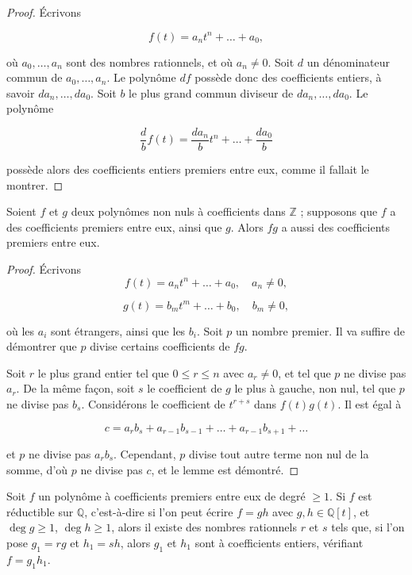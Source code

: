 \begin{proof}
    Écrivons 

\[
f(t) = a_n t^n + \dots + a_0,
\]

où \(a_0, \dots, a_n\) sont des nombres rationnels, et où \(a_n \neq 0\). Soit \(d\) un dénominateur commun de \(a_0, \dots, a_n\). Le polynôme \(df\) possède donc des coefficients entiers, à savoir \(da_n, \dots, da_0\). Soit \(b\) le plus grand commun diviseur de \(da_n, \dots, da_0\). Le polynôme 

\[
\frac{d}{b} f(t) = \frac{da_n}{b} t^n + \dots + \frac{da_0}{b}
\]

possède alors des coefficients entiers premiers entre eux, comme il fallait le montrer.
\end{proof}

\begin{lemme}
    Soient \(f\) et \(g\) deux polynômes non nuls à coefficients dans \(\mathbb{Z}\) ; supposons que \(f\) a des coefficients premiers entre eux, ainsi que \(g\). Alors \(fg\) a aussi des coefficients premiers entre eux.
\end{lemme}
    
\begin{proof}
    Écrivons
    \[
    f(t) = a_n t^n + \dots + a_0, \quad a_n \neq 0,
    \]
    
    \[
    g(t) = b_m t^m + \dots + b_0, \quad b_m \neq 0,
    \]
    
    où les \(a_i\) sont étrangers, ainsi que les \(b_i\). Soit \(p\) un nombre premier. Il va suffire de démontrer que \(p\) divise certains coefficients de \(fg\). 
    
    Soit \(r\) le plus grand entier tel que \(0 \leq r \leq n\) avec \(a_r \neq 0\), et tel que \(p\) ne divise pas \(a_r\). De la même façon, soit \(s\) le coefficient de \(g\) le plus à gauche, non nul, tel que \(p\) ne divise pas \(b_s\). Considérons le coefficient de \(t^{r+s}\) dans \(f(t) g(t)\). Il est égal à
    
    \[
    c = a_r b_s + a_{r-1} b_{s-1} + \dots + a_{r-1} b_{s+1} + \dots
    \]
    
    et \(p\) ne divise pas \(a_r b_s\). Cependant, \(p\) divise tout autre terme non nul de la somme, d'où \(p\) ne divise pas \(c\), et le lemme est démontré.
\end{proof}

\begin{theoreme}[Gauss]
        Soit \(f\) un polynôme à coefficients premiers entre eux de degré \(\geq 1\). Si \(f\) est réductible sur \(\mathbb{Q}\), c'est-à-dire si l’on peut écrire \(f = gh\) avec \(g, h \in \mathbb{Q}[t]\), et \(\deg g \geq 1\), \(\deg h \geq 1\), alors il existe des nombres rationnels \(r\) et \(s\) tels que, si l’on pose \(g_1 = rg\) et \(h_1 = sh\), alors \(g_1\) et \(h_1\) sont à coefficients entiers, vérifiant \(f = g_1 h_1\).
\end{theoreme}

